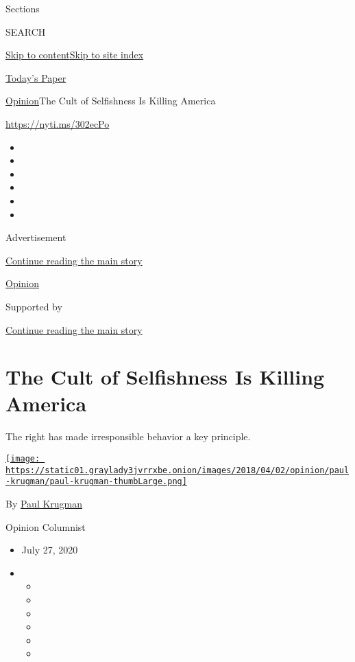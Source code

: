 Sections

SEARCH

\protect\hyperlink{site-content}{Skip to
content}\protect\hyperlink{site-index}{Skip to site index}

\href{https://myaccount.nytimes3xbfgragh.onion/auth/login?response_type=cookie\&client_id=vi}{}

\href{https://www.nytimes3xbfgragh.onion/section/todayspaper}{Today's
Paper}

\href{/section/opinion}{Opinion}\textbar{}The Cult of Selfishness Is
Killing America

\href{https://nyti.ms/302ecPo}{https://nyti.ms/302ecPo}

\begin{itemize}
\item
\item
\item
\item
\item
\item
\end{itemize}

Advertisement

\protect\hyperlink{after-top}{Continue reading the main story}

\href{/section/opinion}{Opinion}

Supported by

\protect\hyperlink{after-sponsor}{Continue reading the main story}

\hypertarget{the-cult-of-selfishness-is-killing-america}{%
\section{The Cult of Selfishness Is Killing
America}\label{the-cult-of-selfishness-is-killing-america}}

The right has made irresponsible behavior a key principle.

\href{https://www.nytimes3xbfgragh.onion/by/paul-krugman}{\texttt{[image: https://static01.graylady3jvrrxbe.onion/images/2018/04/02/opinion/paul-krugman/paul-krugman-thumbLarge.png]}}

By \href{https://www.nytimes3xbfgragh.onion/by/paul-krugman}{Paul
Krugman}

Opinion Columnist

\begin{itemize}
\item
  July 27, 2020
\item
  \begin{itemize}
  \item
  \item
  \item
  \item
  \item
  \item
  \end{itemize}
\end{itemize}

